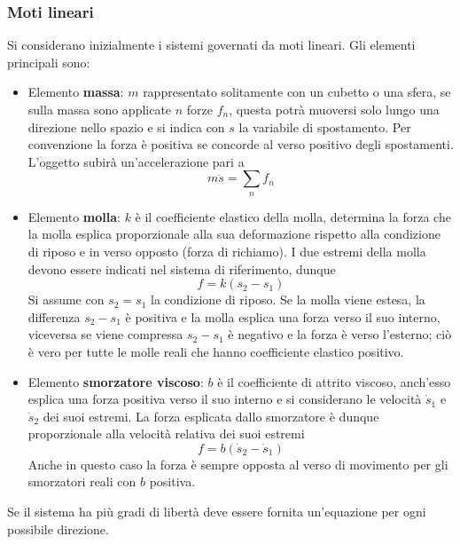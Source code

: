 \subsubsection{Moti lineari}
Si considerano inizialmente i sistemi governati da moti lineari.
Gli elementi principali sono:
\begin{itemize}
 \item Elemento \textbf{massa}: $m$ rappresentato solitamente con un cubetto o
una sfera, se sulla massa sono applicate $n$ forze $f_n$, questa potrà muoversi
solo lungo una direzione nello spazio e si indica con $s$ la variabile di
spostamento. Per convenzione la forza è positiva se concorde al verso positivo
degli spostamenti. L'oggetto subirà un'accelerazione pari a
$$
m\ddot{s} = \sum_n f_n
$$

\item Elemento \textbf{molla}: $k$ è il coefficiente elastico della molla,
determina la forza che la molla esplica proporzionale alla sua deformazione
rispetto alla condizione di riposo e in verso opposto (forza di richiamo).
I due estremi della molla devono essere indicati nel sistema di riferimento,
dunque
$$
f = k(s_2-s_1)
$$
Si assume con $s_2=s_1$ la condizione di riposo. Se la molla viene estesa, la
differenza $s_2-s_1$ è positiva e la molla esplica una forza verso il suo
interno, viceversa se viene compressa $s_2-s_1$ è negativo e la forza è verso
l'esterno; ciò è vero per tutte le molle reali che hanno coefficiente elastico
positivo.

\item Elemento \textbf{smorzatore viscoso}: $b$ è il coefficiente di attrito
viscoso, anch'esso esplica una forza positiva verso il suo interno e si
considerano le velocità $\dot{s}_1$ e $\dot{s}_2$ dei suoi estremi.
La forza esplicata dallo smorzatore è dunque proporzionale alla velocità
relativa dei suoi estremi
$$
f = b(\dot{s}_2-\dot{s}_1)
$$
Anche in questo caso la forza è sempre opposta al verso di movimento per gli
smorzatori reali con $b$ positiva.
\end{itemize}

Se il sistema ha più gradi di libertà deve essere fornita un'equazione per ogni
possibile direzione.

\newpage
